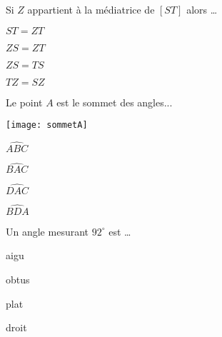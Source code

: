 \begin{QCM}
\begin{GroupeQCM}
     \begin{exercice}
     Si $Z$ appartient à la médiatrice de $[ST]$ alors \ldots
      \begin{ChoixQCM}{4}
      \item $ST = ZT$
      \item $ZS = ZT$
      \item $ZS = TS$
      \item $TZ = SZ$
      \end{ChoixQCM}
\begin{corrige}
   \end{corrige}
    \end{exercice}
    

     \begin{exercice}
     Le point $A$ est le sommet des angles... \vspace{-2em}\begin{center}\texttt{[image: sommetA]}\end{center}\vspace{-1em}
      \begin{ChoixQCM}{4}
      \item $\widehat{ABC}$
      \item $\widehat{BAC}$
      \item $\widehat{DAC}$
      \item $\widehat{BDA}$
      \end{ChoixQCM}
\begin{corrige}
   \end{corrige}
    \end{exercice}
    
    
     \begin{exercice}
     Un angle mesurant $92^\circ$ est \ldots
      \begin{ChoixQCM}{4}
      \item aigu
      \item obtus
      \item plat
      \item droit
      \end{ChoixQCM}
\begin{corrige}
   \end{corrige}
    \end{exercice}
    

\end{GroupeQCM}
\end{QCM}
